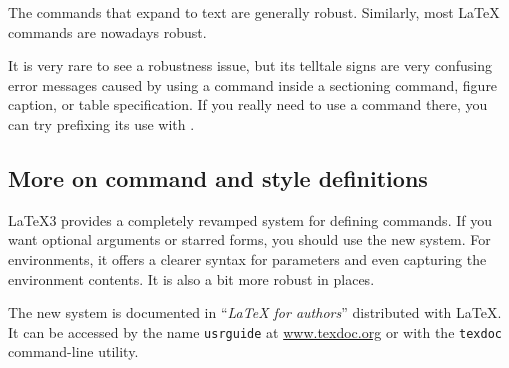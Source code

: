 The commands that expand to text are generally robust.
Similarly, most \LaTeX{} commands are nowadays robust.

It is very rare to see a robustness issue,
but its telltale signs are very confusing error messages
caused by using a command inside a sectioning command, figure caption, or table specification.
If you really need to use a command there,
you can try prefixing its use with .


%
%
\subsection{More on command and style definitions}\label{sec:latex3 commands}

\LaTeX3 provides a completely revamped system for defining commands.
If you want optional arguments or starred forms,
you should use the new system.
For environments, it offers a clearer syntax for parameters
and even capturing the environment contents.
It is also a bit more robust in places.

The new system is documented in ``\emph{\LaTeX{} for authors}'' distributed with \LaTeX.
It can be accessed by the name \texttt{usrguide} at \url{www.texdoc.org}
or with the \verb|texdoc| command-line utility.



